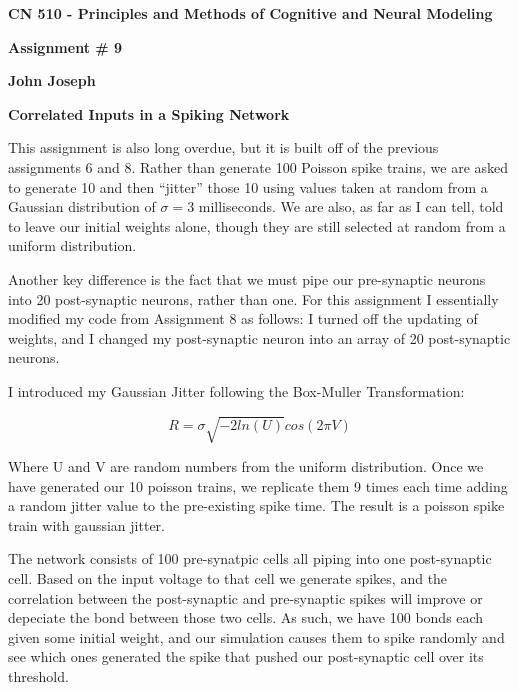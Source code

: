 \documentclass[a4paper,12pt]{article}
\begin{document}
\begin{center}

{\Large\bf CN 510 - Principles and Methods of Cognitive and Neural Modeling}

\bigskip

{\large\bf Assignment \# 9}
\smallskip

{\large\bf John Joseph}
\end{center}

\bigskip
{\bf Correlated Inputs in a Spiking Network}
\bigskip

This assignment is also long overdue, but it is built off of the previous assignments 6 and 8. Rather than generate 100 Poisson spike trains, we are asked to generate 10 and then ``jitter'' those 10 using values taken at random from a Gaussian distribution of $\sigma=3$ milliseconds. We are also, as far as I can tell, told to leave our initial weights alone, though they are still selected at random from a uniform distribution. 

\vspace{2mm}

Another key difference is the fact that we must pipe our pre-synaptic neurons into 20 post-synaptic neurons, rather than one. For this assignment I essentially modified my code from Assignment 8 as follows: I turned off the updating of weights, and I changed my post-synaptic neuron into an array of 20 post-synaptic neurons. 

\vspace{2mm}

I introduced my Gaussian Jitter following the Box-Muller Transformation:

\begin{equation}
R = \sigma \sqrt{-2ln(U)}cos(2\pi V)
\end{equation}

Where U and V are random numbers from the uniform distribution. Once we have generated our 10 poisson trains, we replicate them 9 times each time adding a random jitter value to the pre-existing spike time. The result is a poisson spike train with gaussian jitter. 

\vspace{2mm}

The network consists of 100 pre-synatpic cells all piping into one post-synaptic cell. Based on the input voltage to that cell we generate spikes, and the correlation between the post-synaptic and pre-synaptic spikes will improve or depeciate the bond between those two cells. As such, we have 100 bonds each given some initial weight, and our simulation causes them to spike randomly and see which ones generated the spike that pushed our post-synaptic cell over its threshold.
\end{document}
